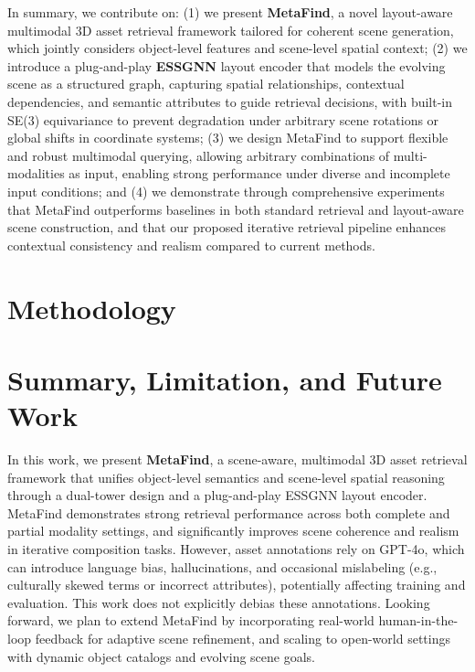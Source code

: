 \documentclass{article}
\begin{document}
In summary, we contribute on: (1) we present \textbf{MetaFind}, a novel layout-aware multimodal 3D asset retrieval framework tailored for coherent scene generation, which jointly considers object-level features and scene-level spatial context; (2) we introduce a plug-and-play \textbf{ESSGNN} layout encoder that models the evolving scene as a structured graph, capturing spatial relationships, contextual dependencies, and semantic attributes to guide retrieval decisions, with built-in SE(3) equivariance to prevent degradation under arbitrary scene rotations or global shifts in coordinate systems; (3) we design MetaFind to support flexible and robust multimodal querying, allowing arbitrary combinations of multi-modalities as input, enabling strong performance under diverse and incomplete input conditions; and (4) we demonstrate through comprehensive experiments that MetaFind outperforms baselines in both standard retrieval and layout-aware scene construction, and that our proposed iterative retrieval pipeline enhances contextual consistency and realism compared to current methods.

\section{Methodology}


\section{Summary, Limitation, and Future Work}
\label{sec:summary}
In this work, we present \textbf{MetaFind}, a scene-aware, multimodal 3D asset retrieval framework that unifies object-level semantics and scene-level spatial reasoning through a dual-tower design and a plug-and-play ESSGNN layout encoder. MetaFind demonstrates strong retrieval performance across both complete and partial modality settings, and significantly improves scene coherence and realism in iterative composition tasks. However, asset annotations rely on GPT-4o, which can introduce language bias, hallucinations, and occasional mislabeling (e.g., culturally skewed terms or incorrect attributes), potentially affecting training and evaluation. This work does not explicitly debias these annotations. Looking forward, we plan to extend MetaFind by incorporating real-world human-in-the-loop feedback for adaptive scene refinement, and scaling to open-world settings with dynamic object catalogs and evolving scene goals.
\end{document}
